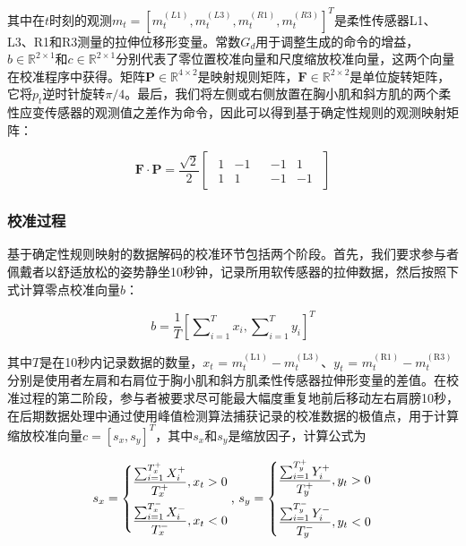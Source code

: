 其中在$t$时刻的观测${m_t} = {[m_t^{(L1)},m_t^{(L3)},m_t^{(R1)},m_t^{(R3)}]^T}$是柔性传感器L1、L3、R1和R3测量的拉伸位移形变量。常数${G_d}$用于调整生成的命令的增益，$b\in {\mathbb{R}^{2 \times 1}}$和$c \in {\mathbb{R}^{2 \times 1}}$分别代表了零位置校准向量和尺度缩放校准向量，这两个向量在校准程序中获得。矩阵$\boldsymbol{P} \in {\mathbb{R}^{4 \times 2}}$是映射规则矩阵，$\boldsymbol{F} \in {\mathbb{R}^{2 \times 2}}$是单位旋转矩阵，它将$p_t$逆时针旋转$\pi /4$。最后，我们将左侧或右侧放置在胸小肌和斜方肌的两个柔性应变传感器的观测值之差作为命令，因此可以得到基于确定性规则的观测映射矩阵：

\[{\boldsymbol{F}} \cdot {\boldsymbol{P}} = \frac{{\sqrt 2 }}{2}\left[ {\begin{array}{*{20}{c}}
{\begin{array}{*{20}{c}}
1&{ - 1}  \\  
1&1 
\end{array}}&{\begin{array}{*{20}{c}}
{ - 1}&1  \\  
{ - 1}&{ - 1} 
\end{array}} 
\end{array}} \right]\]   

\subsubsection{校准过程}
基于确定性规则映射的数据解码的校准环节包括两个阶段。首先，我们要求参与者佩戴者以舒适放松的姿势静坐10秒钟，记录所用软传感器的拉伸数据，然后按照下式计算零点校准向量$b$：

\begin{equation}
\label{eq10}
b = \frac{1}{T}{\left[ {\sum\nolimits_{i = 1}^T {{x_i}} ,\sum\nolimits_{i = 1}^T {{y_i}} } \right]^T}
\end{equation}    

其中$T$是在10秒内记录数据的数量，${x_t}{\text{ = }}m_t^{({\text{L}}1)} - m_t^{({\text{L}}3)}$、${y_t}{\text{ = }}m_t^{({\text{R}}1)} - m_t^{({\text{R}}3)}$分别是使用者左肩和右肩位于胸小肌和斜方肌柔性传感器拉伸形变量的差值。在校准过程的第二阶段，参与者被要求尽可能最大幅度重复地前后移动左右肩膀10秒，在后期数据处理中通过使用峰值检测算法捕获记录的校准数据的极值点，用于计算缩放校准向量$c = {[{s_x},{s_y}]^T}$，其中${s_x}$和${s_y}$是缩放因子，计算公式为

\begin{equation}
\label{eq11}
{s_x} = \left \{  \begin{gathered}
    \frac{{\sum\nolimits_{i = 1}^{T_x^ + } {X_i^ + } }}{{T_x^ + }},{x_t} > 0 \hfill  \\ 
    \frac{{\sum\nolimits_{i = 1}^{T_x^ - } {X_i^ - } }}{{T_x^ - }},{x_t} < 0 \hfill  \\  
  \end{gathered}  \right.{\text{, }}{s_y} = \left \{  \begin{gathered}
    \frac{{\sum\nolimits_{i = 1}^{T_y^ + } {Y_i^ + } }}{{T_y^ + }},{y_t} > 0 \hfill  \\ 
    \frac{{\sum\nolimits_{i = 1}^{T_y^ - } {Y_i^ - } }}{{T_y^ - }},{y_t} < 0 \hfill  \\  
  \end{gathered}  \right.
\end{equation}    

